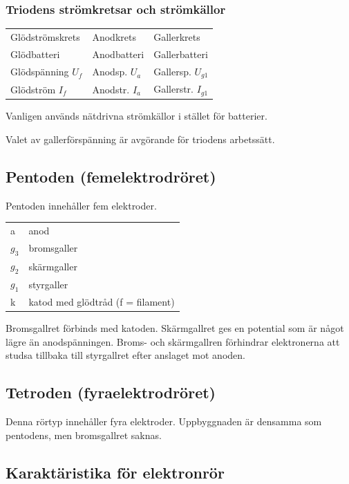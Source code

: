 \subsubsection{Triodens strömkretsar och strömkällor}

\begin{tabular}{lll}
Glödströmskrets      & Anodkrets        &  Gallerkrets \\
Glödbatteri          & Anodbatteri      &  Gallerbatteri \\
Glödspänning \(U_f\) & Anodsp. \(U_a\)  &  Gallersp. \(U_{g1}\) \\
Glödström \(I_f\)    & Anodstr. \(I_a\) &  Gallerstr. \(I_{g1}\) \\
\end{tabular}

Vanligen används nätdrivna strömkällor i stället för batterier.

Valet av gallerförspänning är avgörande för triodens arbetssätt.

\subsection{Pentoden (femelektrodröret)}

Pentoden innehåller fem elektroder.

\begin{tabular}{ll}
  a       & anod \\
  \(g_3\) & bromsgaller \\
  \(g_2\) & skärmgaller \\
  \(g_1\) & styrgaller \\
  k      & katod med glödtråd (f = filament) \\
\end{tabular}

Bromsgallret förbinds med katoden. Skärmgallret ges en potential som är något lägre än anodspänningen. Broms- och skärmgallren förhindrar elektronerna att studsa tillbaka till styrgallret efter anslaget mot anoden.


\subsection{Tetroden (fyraelektrodröret)}

Denna rörtyp innehåller fyra elektroder. Uppbyggnaden är densamma som pentodens,
men bromsgallret saknas.

\subsection{Karaktäristika för elektronrör}

